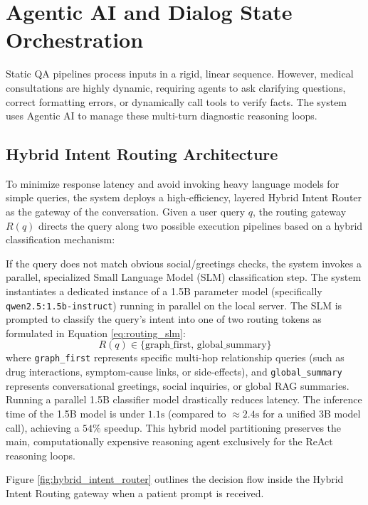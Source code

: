 \documentclass[../main.tex]{subfiles}
\begin{document}
\section{Agentic AI and Dialog State Orchestration}
\label{section:3.3}

Static QA pipelines process inputs in a rigid, linear sequence. However, medical consultations are highly dynamic, requiring agents to ask clarifying questions, correct formatting errors, or dynamically call tools to verify facts. The system uses Agentic AI to manage these multi-turn diagnostic reasoning loops.

\subsection{Hybrid Intent Routing Architecture}

To minimize response latency and avoid invoking heavy language models for simple queries, the system deploys a high-efficiency, layered Hybrid Intent Router as the gateway of the conversation. Given a user query $q$, the routing gateway $R(q)$ directs the query along two possible execution pipelines based on a hybrid classification mechanism:

If the query does not match obvious social/greetings checks, the system invokes a parallel, specialized Small Language Model (SLM) classification step. The system instantiates a dedicated instance of a 1.5B parameter model (specifically \texttt{qwen2.5:1.5b-instruct}) running in parallel on the local server. The SLM is prompted to classify the query's intent into one of two routing tokens as formulated in Equation \eqref{eq:routing_slm}:
\begin{equation}\label{eq:routing_slm}
R(q) \in \{ \text{graph\_first}, \, \text{global\_summary} \}
\end{equation}
where \texttt{graph\_first} represents specific multi-hop relationship queries (such as drug interactions, symptom-cause links, or side-effects), and \texttt{global\_summary} represents conversational greetings, social inquiries, or global RAG summaries.
Running a parallel 1.5B classifier model drastically reduces latency. The inference time of the 1.5B model is under $1.1\text{s}$ (compared to $\approx 2.4\text{s}$ for a unified 3B model call), achieving a $54\%$ speedup. This hybrid model partitioning preserves the main, computationally expensive reasoning agent exclusively for the ReAct reasoning loops.

Figure \ref{fig:hybrid_intent_router} outlines the decision flow inside the Hybrid Intent Routing gateway when a patient prompt is received.
\end{document}

